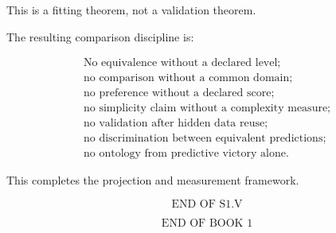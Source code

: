 \documentclass[11pt,oneside,openany]{book}
\begin{document}
This is a fitting theorem, not a validation theorem.

The resulting comparison discipline is:

\[
\boxed{ \begin{gathered} \text{No equivalence without a declared level;}\\ \text{no comparison without a common domain;}\\ \text{no preference without a declared score;}\\ \text{no simplicity claim without a complexity measure;}\\ \text{no validation after hidden data reuse;}\\ \text{no discrimination between equivalent predictions;}\\ \text{no ontology from predictive victory alone.} \end{gathered} }
\]

This completes the projection and measurement framework.

\[
\boxed{ \text{END OF S1.V} }
\]

\[
\boxed{ \text{END OF BOOK 1} }
\]

\end{document}
